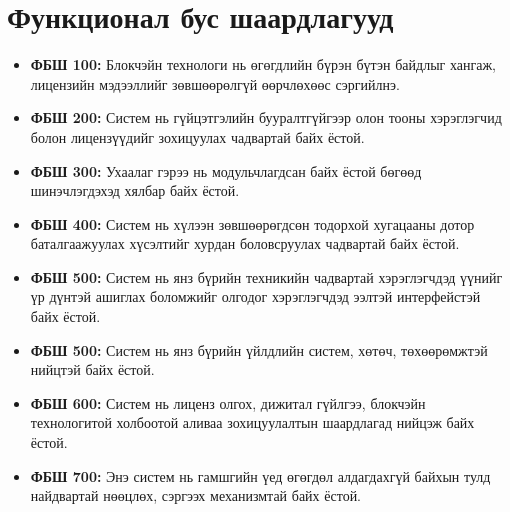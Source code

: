 \section{Функционал бус шаардлагууд}
\begin{itemize}
   \item \textbf{ФБШ 100:} Блокчэйн технологи нь өгөгдлийн бүрэн бүтэн байдлыг хангаж, лицензийн мэдээллийг зөвшөөрөлгүй өөрчлөхөөс сэргийлнэ.
      \item \textbf{ФБШ 200:} Систем нь гүйцэтгэлийн бууралтгүйгээр олон тооны хэрэглэгчид болон лицензүүдийг зохицуулах чадвартай байх ёстой.
      \item \textbf{ФБШ 300:} Ухаалаг гэрээ нь модульчлагдсан байх ёстой бөгөөд шинэчлэгдэхэд хялбар байх ёстой.
      \item \textbf{ФБШ 400:} Систем нь хүлээн зөвшөөрөгдсөн тодорхой хугацааны дотор баталгаажуулах хүсэлтийг хурдан боловсруулах чадвартай байх ёстой.
      \item \textbf{ФБШ 500:} Систем нь янз бүрийн техникийн чадвартай хэрэглэгчдэд үүнийг үр дүнтэй ашиглах боломжийг олгодог хэрэглэгчдэд ээлтэй интерфейстэй байх ёстой.
      \item \textbf{ФБШ 500:} Систем нь янз бүрийн үйлдлийн систем, хөтөч, төхөөрөмжтэй нийцтэй байх ёстой.
      \item \textbf{ФБШ 600:} Систем нь лиценз олгох, дижитал гүйлгээ, блокчэйн технологитой холбоотой аливаа зохицуулалтын шаардлагад нийцэж байх ёстой.
      \item \textbf{ФБШ 700:} Энэ систем нь гамшгийн үед өгөгдөл алдагдахгүй байхын тулд найдвартай нөөцлөх, сэргээх механизмтай байх ёстой.
\end{itemize}

\newpage
